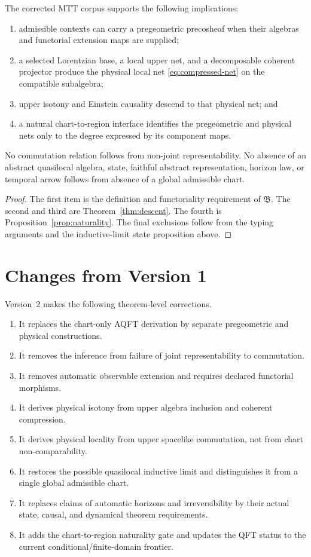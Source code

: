 \documentclass[11pt]{article}
\begin{document}
\begin{theorem}\label{thm:scoped}
The corrected MTT corpus supports the following implications:
\begin{enumerate}
\item admissible contexts can carry a pregeometric precosheaf when their
algebras and functorial extension maps are supplied;
\item a selected Lorentzian base, a local upper net, and a decomposable
coherent projector produce the physical local net
\eqref{eq:compressed-net} on the compatible subalgebra;
\item upper isotony and Einstein causality descend to that physical net; and
\item a natural chart-to-region interface identifies the pregeometric and
physical nets only to the degree expressed by its component maps.
\end{enumerate}
No commutation relation follows from non-joint representability.  No absence
of an abstract quasilocal algebra, state, faithful abstract representation,
horizon law, or temporal arrow follows from absence of a global admissible
chart.
\end{theorem}

\begin{proof}
The first item is the definition and functoriality requirement of
$\mathfrak B$.  The second and third are Theorem~\ref{thm:descent}.  The fourth
is Proposition~\ref{prop:naturality}.  The final exclusions follow from the
typing arguments and the inductive-limit state proposition above.
\end{proof}

\section{Changes from Version 1}

Version~2 makes the following theorem-level corrections.
\begin{enumerate}
\item It replaces the chart-only AQFT derivation by separate pregeometric and
physical constructions.
\item It removes the inference from failure of joint representability to
commutation.
\item It removes automatic observable extension and requires declared
functorial morphisms.
\item It derives physical isotony from upper algebra inclusion and coherent
compression.
\item It derives physical locality from upper spacelike commutation, not from
chart non-comparability.
\item It restores the possible quasilocal inductive limit and distinguishes it
from a single global admissible chart.
\item It replaces claims of automatic horizons and irreversibility by their
actual state, causal, and dynamical theorem requirements.
\item It adds the chart-to-region naturality gate and updates the QFT status to
the current conditional/finite-domain frontier.
\end{enumerate}
\end{document}
